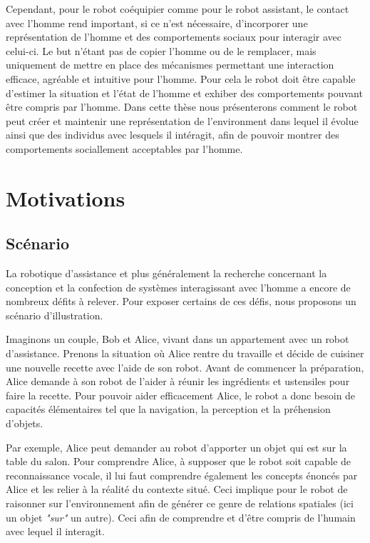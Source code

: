 \documentclass[a4paper,11pt,twoside]{StyleThese}
\begin{document}
Cependant, pour le robot coéquipier comme pour le robot assistant, le contact avec l'homme rend important, si ce n'est nécessaire, d'incorporer une représentation de l'homme et des comportements sociaux pour interagir avec celui-ci. Le but n'étant pas de copier l'homme ou de le remplacer, mais uniquement de mettre en place des mécanismes permettant une interaction efficace, agréable et intuitive pour l'homme. Pour cela le robot doit être capable d'estimer la situation et l'état de l'homme et exhiber des comportements pouvant être compris par l'homme. Dans cette thèse nous présenterons comment le robot peut créer et maintenir une représentation de l'environment dans lequel il évolue ainsi que des individus avec lesquels il intéragit, afin de pouvoir montrer des comportements sociallement acceptables par l'homme.



\section{Motivations}


\subsection{Scénario}

La robotique d'assistance et plus généralement la recherche concernant la conception et la confection de systèmes interagissant avec l'homme a encore de nombreux défits à relever. Pour exposer certains de ces défis, nous proposons un scénario d'illustration.

Imaginons un couple, Bob et Alice, vivant dans un appartement avec un robot d'assistance. Prenons la situation où Alice rentre du travaille et décide de cuisiner une nouvelle recette avec l'aide de son robot. Avant de commencer la préparation, Alice demande à son robot de l'aider à réunir les ingrédients et ustensiles pour faire la recette.
Pour pouvoir aider efficacement Alice, le robot a donc besoin de capacités élémentaires tel que la navigation, la perception et la préhension d'objets.

Par exemple, Alice peut demander au robot d'apporter un objet qui est sur la table du salon. Pour comprendre Alice, à supposer que le robot soit capable de reconnaissance vocale, il lui faut comprendre également les concepts énoncés par Alice et les relier à la réalité du contexte situé. Ceci implique pour le robot de raisonner sur l'environnement afin de générer ce genre de relations spatiales (ici un objet \textit{"sur"} un autre). Ceci afin de comprendre et d'être compris de l'humain avec lequel il interagit.
\end{document}
